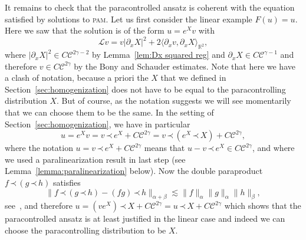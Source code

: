 \documentclass[a4paper,11pt]{article}
\newcommand{\tmname}[1]{\textsc{#1}}
\newcommand{\LL}{\mathscr{L}}
\newcommand{\CC}{\mathscr{C}}
\newcommand{\lpara}{\,\mathord{\prec}\,}
\begin{document}
It remains to check that the paracontrolled ansatz is coherent with the
equation satisfied by solutions to {\tmname{pam}}. Let us first consider the
linear example $F (u) = u$. Here we saw that the solution is of the form $u =
e^X v$ with
\[ \LL v = v | \partial_x X |^2 + 2 \langle \partial_x v, \partial_x X
   \rangle_{\mathbb{R}^2}, \]
where $| \partial_x X |^2 \in C \CC^{2 \gamma - 2}$ by Lemma~\ref{lem:Dx squared reg} and $\partial_x X \in C
\CC^{\gamma - 1}$ and therefore $v \in C \CC^{2 \gamma}$ by the Bony and Schauder estimates. Note that here we have a clash of notation, because a priori the $X$ that we defined in Section~\ref{sec:homogenization} does not have to be equal to the paracontrolling distribution $X$. But of course, as the notation suggests we will see momentarily that we can choose them to be the same. In the setting of Section~\ref{sec:homogenization}, we have in particular
\[ u = e^X v = v \lpara e^X + C \CC^{2 \gamma} = v \lpara (e^X \lpara X) + C
   \CC^{2 \gamma}, \]
   where the notation $u = v \lpara e^X + C \CC^{2\gamma}$ means that $u - v \lpara e^X \in C \CC^{2\gamma}$, and where we used a paralinearization result in last step (see
Lemma~\ref{lemma:paralinearization} below). Now the double paraproduct $f
\lpara (g \lpara h)$ satisfies
\[ \| f \lpara (g \lpara h) - (f g) \lpara h \|_{\alpha + \beta} \lesssim \| f
   \|_{\alpha} \| g \|_{\alpha} \| h \|_{\beta}, \]
see~{\cite{Bony1981}}, and therefore $u = (v e^X) \lpara X + C \CC^{2 \gamma} =
u \lpara X + C \CC^{2 \gamma}$ which shows that the paracontrolled ansatz is at
least justified in the linear case and indeed we can choose the paracontrolling distribution to be $X$.

\
\end{document}
